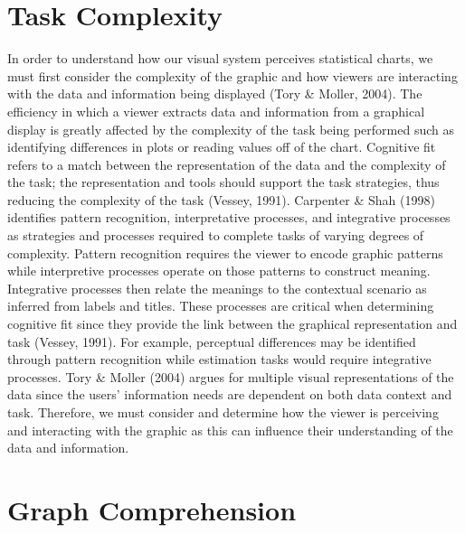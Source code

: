 \documentclass[print]{nuthesis}
\begin{document}
\hypertarget{task-complexity}{%
\section{Task Complexity}\label{task-complexity}}

In order to understand how our visual system perceives statistical charts, we must first consider the complexity of the graphic and how viewers are interacting with the data and information being displayed (Tory \& Moller, 2004).
The efficiency in which a viewer extracts data and information from a graphical display is greatly affected by the complexity of the task being performed such as identifying differences in plots or reading values off of the chart.
Cognitive fit refers to a match between the representation of the data and the complexity of the task; the representation and tools should support the task strategies, thus reducing the complexity of the task (Vessey, 1991).
Carpenter \& Shah (1998) identifies pattern recognition, interpretative processes, and integrative processes as strategies and processes required to complete tasks of varying degrees of complexity.
Pattern recognition requires the viewer to encode graphic patterns while interpretive processes operate on those patterns to construct meaning.
Integrative processes then relate the meanings to the contextual scenario as inferred from labels and titles.
These processes are critical when determining cognitive fit since they provide the link between the graphical representation and task (Vessey, 1991).
For example, perceptual differences may be identified through pattern recognition while estimation tasks would require integrative processes.
Tory \& Moller (2004) argues for multiple visual representations of the data since the users' information needs are dependent on both data context and task.
Therefore, we must consider and determine how the viewer is perceiving and interacting with the graphic as this can influence their understanding of the data and information.

\hypertarget{graph-comprehension}{%
\section{Graph Comprehension}\label{graph-comprehension}}
\end{document}
